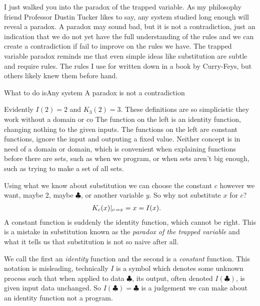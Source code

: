 I just walked you into the paradox of the trapped variable.
As my philosophy friend Professor Dustin Tucker likes to say, 
any system studied long enough will reveal a paradox. 
A paradox may sound bad, but it is not a contradiction, just 
an indication that we do not yet have the full understanding
of the rules and we can create a contradiction if fail to improve 
on the rules we have.  The trapped variable paradox reminds me 
that even simple ideas like substitution are subtle and require 
rules.  The rules I use for written down in a book by Curry-Feys, 
but others likely knew them before hand.


What to do isAny system 
A paradox is not a contradiction


Evidently $I(2)=2$ and $K_3(2)=3$.  These definitions are so simplicistic 
they work without a domain or co
The function on the left is an identity function, changing nothing 
to the given inputs.  The functions on the left are constant functions, 
ignore the input and outputing a fixed value.  Neither concept 
is in need of a domain or domain, which is convenient when explaining 
functions before there are sets, such as when we program, or when sets 
aren't big enough, such as trying to make a set of all sets.

Using what we know about substitution we can choose the constant $c$
however we want, maybe 2, maybe $\clubsuit$, or another variable $y$.
So why not substitute $x$ for $c$?
\begin{align*}
    K_c(x)|_{c\defeq x} & = x = I(x).
\end{align*}
A constant function is suddenly the identity function, which cannot be 
right.  This is a mistake in substitution known as the \emph{paradox of 
the trapped variable} and what it tells us that substitution is not so 
naive after all.

We call the first an \emph{identity} function and the second is a \emph{constant}
function.  This notation is misleading, technically $I$ is a symbol
which denotes some unknown process such that when applied to data $\clubsuit$,
its output, often denoted $I(\clubsuit)$, is given input data unchanged.
So $I(\clubsuit)=\clubsuit$ is a judgement we can make about an identity 
function not a program.

